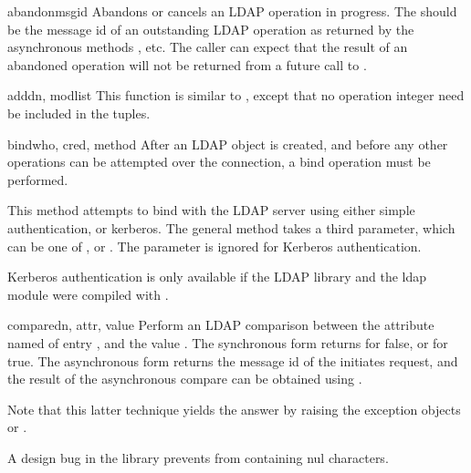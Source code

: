 
\begin{methoddesc}{abandon}{msgid}
Abandons or cancels an LDAP operation in progress. The 
should be the message id of an outstanding LDAP operation as returned by
the asynchronous methods ,  etc. 
The caller can expect that the result
of an abandoned operation will not be returned from a future call to 
.
\end{methoddesc}


\begin{methoddesc}[int]{add}{dn, modlist}
This function is similar to , except that no operation
integer need be included in the tuples.
\end{methoddesc}


\begin{methoddesc}[int]{bind}{who, cred, method}
After an LDAP object is created, and before any other operations can be
attempted over the connection, a bind operation must be performed.

This method attempts to bind with the LDAP server using 
either simple authentication, or kerberos. The general method 
takes a third parameter,  which can be one of
,  or .
The  parameter is ignored for Kerberos authentication.

Kerberos authentication is only available if the LDAP library and 
the ldap module were compiled with .
\end{methoddesc}


\begin{methoddesc}[int]{compare}{dn, attr, value}
Perform an LDAP comparison between the attribute named  of 
entry , and the value . The synchronous form
returns  for false, or  for true.
The asynchronous form returns the message id of the initiates request, 
and the result of the asynchronous compare can be obtained using 
.  

Note that this latter technique yields the answer
by raising the exception objects  or
.

A design bug in the library prevents  from containing nul characters.
\end{methoddesc}

